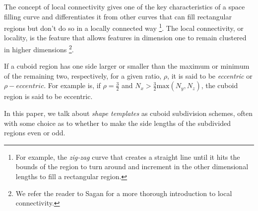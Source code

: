 The concept of local connectivity gives one of the key characteristics of a space filling curve
and differentiates it from other curves that can fill rectangular regions but don't do so in a
locally connected way \footnote{For example, the \textit{zig-zag} curve that creates a straight line until
it hits the bounds of the region to turn around and increment in the other dimensional lengths to fill 
a rectangular region.}.
The local connectivity, or locality, is the feature that allows features in dimension one to
remain clustered in higher dimensions \footnote{We refer the reader to
Sagan \cite{sagan_1994} for a more thorough introduction to local connectivity.}.

If a cuboid region has one side larger or smaller than the maximum or minimum of the remaining two, respectively,
for a given ratio, $\rho$, it is said to be \textit{eccentric} or $\rho-\textit{eccentric}$.
For example is, if $\rho=\frac{3}{2}$ and $N _ x > \frac{3}{2} \text{max}(N_y, N_z)$, the cuboid region is said to be eccentric.

In this paper, we talk about \textit{shape templates} as cuboid subdivision schemes, often with some choice as to whether
to make the side lengths of the subdivided regions even or odd.


